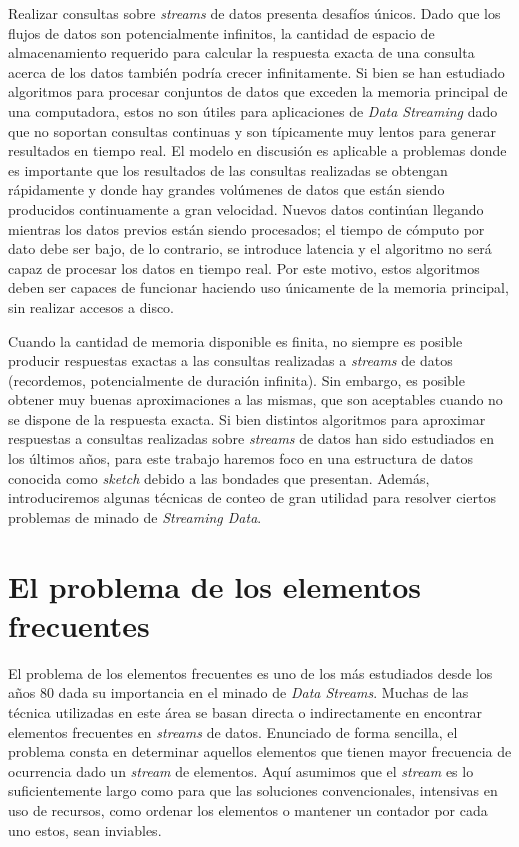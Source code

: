 \documentclass[a4paper,10pt, oneside]{article}
\begin{document}
Realizar consultas sobre \textit{streams} de datos presenta desafíos únicos. Dado que los flujos de datos son potencialmente infinitos, la cantidad de espacio de almacenamiento requerido para calcular la respuesta exacta de una consulta acerca de los datos también podría crecer infinitamente. Si bien se han estudiado algoritmos para procesar conjuntos de datos que exceden la memoria principal de una computadora\cite{Vitter:2001:EMA:384192.384193}, estos no son útiles para aplicaciones de \textit{Data Streaming} dado que no soportan consultas continuas y son típicamente muy lentos para generar resultados en tiempo real. El modelo en discusión es aplicable a problemas donde es importante que los resultados de las consultas realizadas se obtengan rápidamente y donde hay grandes volúmenes de datos que están siendo producidos continuamente a gran velocidad. Nuevos datos continúan llegando mientras los datos previos están siendo procesados; el tiempo de cómputo por dato debe ser bajo, de lo contrario, se introduce latencia y el algoritmo no será capaz de procesar los datos en tiempo real. Por este motivo, estos algoritmos deben ser capaces de funcionar haciendo uso únicamente de la memoria principal, sin realizar accesos a disco.

Cuando la cantidad de memoria disponible es finita, no siempre es posible producir respuestas exactas a las consultas realizadas a \textit{streams} de datos (recordemos, potencialmente de duración infinita). Sin embargo, es posible obtener muy buenas aproximaciones a las mismas, que son aceptables cuando no se dispone de la respuesta exacta. Si bien distintos algoritmos para aproximar respuestas a consultas realizadas sobre \textit{streams} de datos han sido estudiados en los últimos años, para este trabajo haremos foco en una estructura de datos conocida como  \textit{sketch}\cite{Alon:1996:SCA:237814.237823}\cite{Flajolet:1985:PCA:5212.5215} debido a las bondades que presentan. Además, introduciremos algunas técnicas de conteo de gran utilidad para resolver ciertos problemas de minado de \textit{Streaming Data}.


\newpage

\section{El problema de los elementos frecuentes}
El problema de los elementos frecuentes es uno de los más estudiados desde los años 80 dada su importancia en el minado de \textit{Data Streams}. Muchas de las técnica utilizadas en este área se basan directa o indirectamente en encontrar elementos frecuentes en \textit{streams} de datos. Enunciado de forma sencilla, el problema consta en determinar aquellos elementos que tienen mayor frecuencia de ocurrencia dado un \textit{stream} de elementos. Aquí asumimos que el \textit{stream} es lo suficientemente largo como para que las soluciones convencionales, intensivas en uso de recursos, como ordenar los elementos o mantener un contador por cada uno estos, sean inviables. 
\
\end{document}

